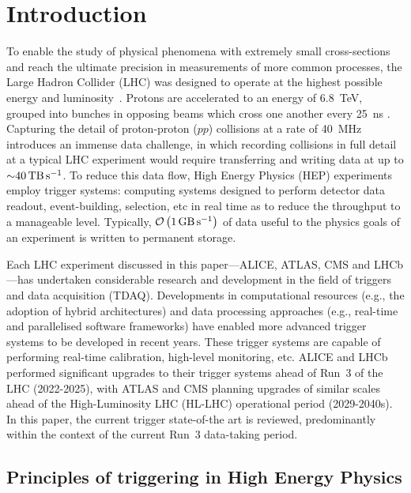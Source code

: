 \section{Introduction}

To enable the study of physical phenomena with extremely small cross-sections and reach the ultimate precision in measurements of more common processes, the Large Hadron Collider (LHC) was designed to operate at the highest possible energy and luminosity~\cite{CERN:lhc-design-report}. Protons are accelerated to an energy of \SI{6.8}{\tera\electronvolt}, grouped into bunches in opposing beams which cross one another every \SI{25}{\nano\second} \cite{CERN:lhc-run3-operation}. Capturing the detail of proton-proton ($pp$) collisions at a rate of \SI{40}{\mega\hertz} introduces an immense data challenge, in which recording collisions in full detail at a typical LHC experiment would require transferring and writing data at up to ${\sim}\SI{40}{\tera\byte\per\second}$. To reduce this data flow, High Energy Physics (HEP) experiments employ trigger systems: computing systems designed to perform detector data readout, event-building, selection, etc in real time as to reduce the throughput to a manageable level. Typically, $\mathcal{O}\left(\SI{1}{\giga\byte\per\second}\right)$ of data useful to the physics goals of an experiment is written to permanent storage.

Each LHC experiment discussed in this paper—ALICE, ATLAS, CMS and LHCb—has undertaken considerable research and development in the field of triggers and data acquisition (TDAQ). Developments in computational resources (e.g., the adoption of hybrid architectures) and data processing approaches (e.g., real-time and parallelised software frameworks) have enabled more advanced trigger systems to be developed in recent years. These trigger systems are capable of performing real-time calibration, high-level monitoring, etc. ALICE and LHCb performed significant upgrades to their trigger systems ahead of Run~3 of the LHC (2022-2025), with ATLAS and CMS planning upgrades of similar scales ahead of the High-Luminosity LHC (HL-LHC) operational period (2029-2040s). In this paper, the current trigger state-of-the art is reviewed, predominantly within the context of the current Run~3 data-taking period.

\subsection{Principles of triggering in High Energy Physics}

